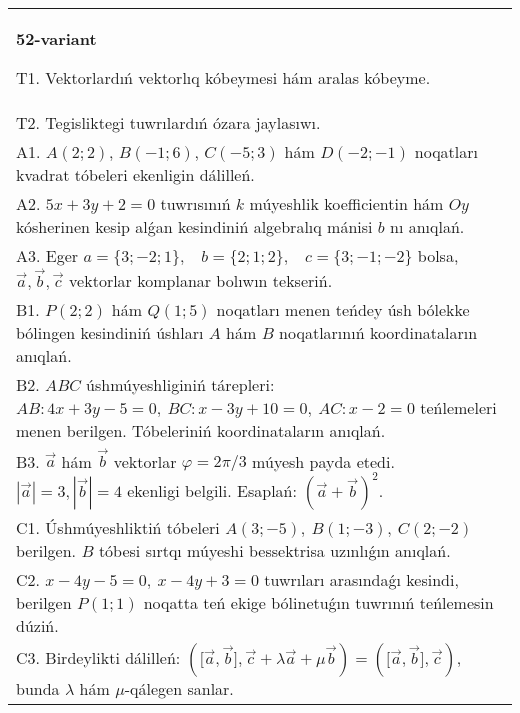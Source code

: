 \documentclass{article}
\begin{document}
    
    \begin{tabular}{m{17cm}}
    \textbf{52-variant}
    \newline
    
    T1. 
    Vektorlardıń vektorlıq kóbeymesi hám aralas kóbeyme.
     \\
    T2. 
    Tegisliktegi tuwrılardıń ózara jaylasıwı.
     \\
    A1. 
    $A(2;2)$, $B(-1;6)$, $C(-5;3)$ hám $D(-2;-1)$
    noqatları kvadrat tóbeleri ekenligin dálilleń.
     \\
    A2. 
    $5x+3y+2=0$ tuwrısınıń $k$ múyeshlik
    koefficientin hám $Oy$ kósherinen kesip alǵan kesindiniń algebralıq
    mánisi $b$ nı anıqlań.
     \\
    A3. 
    Eger \(a = \{ 3; - 2;1\},\ \ \ \ b = \{ 2;1;2\},\ \ \ \ c = \{ 3; - 1; - 2\}\) bolsa, $\overrightarrow{a}, \overrightarrow{b}, \overrightarrow{c}$ vektorlar komplanar bolıwın tekseriń.
     \\
    B1. 
    \(P(2;2)\) hám \(Q(1;5)\) noqatları menen teńdey úsh
    bólekke bólingen kesindiniń úshları $A$ hám $B$ noqatlarınıń
    koordinataların anıqlań.
     \\
    B2. 
    $ABC$ úshmúyeshliginiń tárepleri: 
    \(AB:4x+3y-5=0,\ BC:x-3y+10=0,\ AC:x-2=0
    \) teńlemeleri menen berilgen. Tóbeleriniń koordinataların anıqlań.
     \\
    B3. 
    $\vec{a}$ hám $\vec{b}$ vektorlar $\varphi = 2\pi/3$ múyesh payda etedi. $|\vec{a}| = 3,|\vec{b}| = 4$ ekenligi belgili. Esaplań: 
    $(\vec{a} + \vec{b}) ^{2}$.
     \\
    C1. 
    Úshmúyeshliktiń tóbeleri
    \(A(3; - 5),\ B(1; - 3),\ C(2; - 2)\) berilgen. $B$ tóbesi sırtqı
    múyeshi bessektrisa uzınlıǵın anıqlań.
     \\
    C2. 
    \(x - 4y - 5 = 0,\ x - 4y + 3 = 0\) tuwrıları
    arasındaǵı kesindi, berilgen \(P(1;1)\) noqatta teń ekige bólinetuǵın
    tuwrınıń teńlemesin dúziń.
     \\
    C3. 
    Birdeylikti dálilleń: \((\lbrack\vec{a},\vec{b}\rbrack,\vec{c} + \lambda\vec{a} + \mu\vec{b}) = (\lbrack\vec{a},\vec{b}\rbrack,\vec{c})\), bunda \(\lambda\) hám \(\mu\)-qálegen sanlar.
     \\
    
    \end{tabular}
    \vspace{1cm}
    
\end{document}
